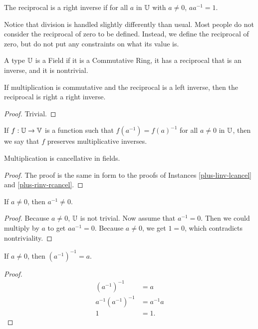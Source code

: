 \documentclass[../math.tex]{subfiles}
\begin{document}
\begin{class}
    The reciprocal is a right inverse if for all $a$ in $\mathbb{U}$ with $a \neq 0$,
    $aa^{-1} = 1$.
\end{class}

Notice that division is handled slightly differently than usual.  Most people do
not consider the reciprocal of zero to be defined.  Instead, we define the
reciprocal of zero, but do not put any constraints on what its value is.

\begin{class}[Field]
    A type $\mathbb{U}$ is a Field if it is a Commutative Ring, it has a reciprocal that
    is an inverse, and it is nontrivial.
\end{class}

\begin{instance}
    If multiplication is commutative and the reciprocal is a left inverse, then
    the reciprocal is right a right inverse.
\end{instance}
\begin{proof}
    Trivial.
\end{proof}

\begin{class}
    If $f : \mathbb{U} \to \mathbb{V}$ is a function such that $f(a^{-1}) = f(a)^{-1}$ for all
    $a \neq 0$ in $\mathbb{U}$, then we say that $f$ preserves multiplicative inverses.
\end{class}

\begin{instance}
    Multiplication is cancellative in fields.
\end{instance}
\begin{proof}
    The proof is the same in form to the proofs of Instances
    \ref{plus-linv-lcancel} and \ref{plus-rinv-rcancel}.
\end{proof}

\begin{theorem}
    If $a \neq 0$, then $a^{-1} \neq 0$.
\end{theorem}
\begin{proof}
    Because $a \neq 0$, $\mathbb{U}$ is not trivial.  Now assume that $a^{-1} = 0$.
    Then we could multiply by $a$ to get $aa^{-1} = 0$.  Because $a \neq 0$, we
    get $1 = 0$, which contradicts nontriviality.
\end{proof}

\begin{theorem}
    If $a \neq 0$, then $(a^{-1})^{-1} = a$.
\end{theorem}
\begin{proof}
    \begin{align*}
        (a^{-1})^{-1} &= a \\
        a^{-1} (a^{-1})^{-1} &= a^{-1} a \\
        1 &= 1.
    \end{align*}
\end{proof}
\end{document}
